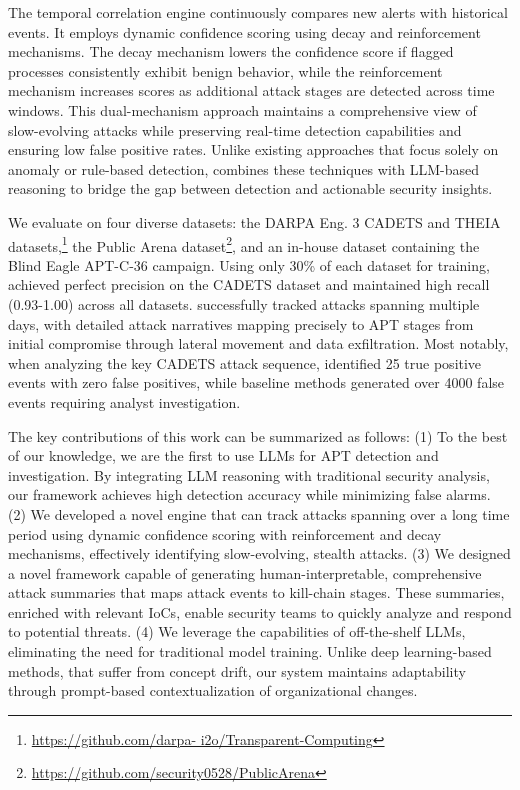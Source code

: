 The temporal correlation engine continuously compares new alerts with historical events. 
It employs dynamic confidence scoring using decay and reinforcement mechanisms. 
The decay mechanism lowers the confidence score if flagged processes consistently exhibit benign behavior, while the reinforcement mechanism increases scores as additional attack stages are detected across time windows. 
This dual-mechanism approach maintains a comprehensive view of slow-evolving attacks while preserving real-time detection capabilities and ensuring low false positive rates. 
Unlike existing approaches that focus solely on anomaly or rule-based detection, \method combines these techniques with LLM-based reasoning to bridge the gap between detection and actionable security insights.

We evaluate \method on four diverse datasets: the DARPA Eng. 3 CADETS and THEIA datasets,\footnote{\scriptsize\url{https://github.com/darpa-
i2o/Transparent-Computing}} the Public Arena dataset\footnote{\scriptsize\url{https://github.com/security0528/PublicArena}}, and an in-house dataset containing the Blind Eagle APT-C-36 campaign. 
Using only 30\% of each dataset for training, \method achieved perfect precision on the CADETS dataset and maintained high recall (0.93-1.00) across all datasets. 
\method successfully tracked attacks spanning multiple days, with detailed attack narratives mapping precisely to APT stages from initial compromise through lateral movement and data exfiltration. 
Most notably, when analyzing the key CADETS attack sequence, \method identified 25 true positive events with zero false positives, while baseline methods generated over 4000 false events requiring analyst investigation.

The key contributions of this work can be summarized as follows:
(1) To the best of our knowledge, we are the first to use LLMs for APT detection and investigation. 
By integrating LLM reasoning with traditional security analysis, our framework achieves high detection accuracy while minimizing false alarms.
(2) We developed a novel engine that can track attacks spanning over a long time period using dynamic confidence scoring with reinforcement and decay mechanisms, effectively identifying slow-evolving, stealth attacks.   
(3) We designed a novel framework capable of generating human-interpretable, comprehensive attack summaries that maps attack events to kill-chain stages. 
These summaries, enriched with relevant IoCs, enable security teams to quickly analyze and respond to potential threats.
(4) We leverage the capabilities of off-the-shelf LLMs, eliminating the need for traditional model training. 
Unlike deep learning-based methods, that suffer from concept drift, our system maintains adaptability through prompt-based contextualization of organizational changes.
    
